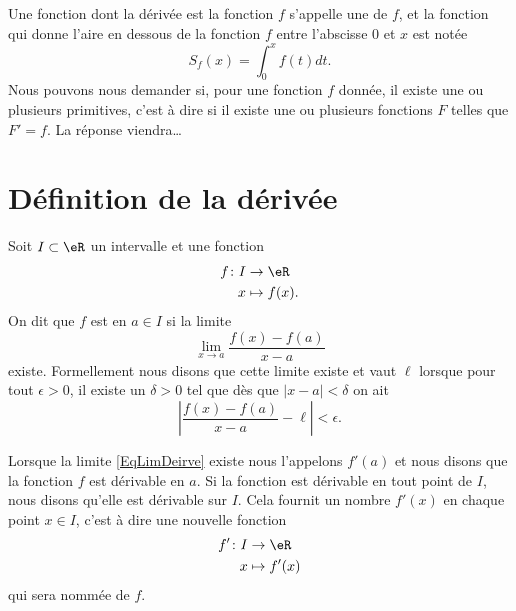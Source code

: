 Une fonction dont la dérivée est la fonction $f$ s'appelle une  de $f$, et la fonction qui donne l'aire en dessous de la fonction $f$ entre l'abscisse $0$ et $x$ est notée
\begin{equation}
	S_f(x)=\int_0^xf(t)dt.
\end{equation}
Nous pouvons nous demander si, pour une fonction $f$ donnée, il existe une ou plusieurs primitives, c'est à dire si il existe une ou plusieurs fonctions $F$ telles que $F'=f$. La réponse viendra\ldots

\section{Définition de la dérivée}

Soit $I\subset\eR$ un intervalle et une fonction
\begin{equation}
	\begin{aligned}
		f\colon I&\to \eR \\
		x&\mapsto f(x). 
	\end{aligned}
\end{equation}
On dit que $f$ est  en $a\in I$ si la limite
\begin{equation}	\label{EqLimDeirve}
	\lim_{x\to a} \frac{ f(x)-f(a) }{ x-a }
\end{equation}
existe. Formellement nous disons que cette limite existe et vaut $\ell$ lorsque pour tout $\epsilon>0$, il existe un $\delta>0$ tel que dès que $| x-a |<\delta$ on ait
\begin{equation}
	\left| \frac{ f(x)-f(a) }{ x-a } -\ell \right| <\epsilon.
\end{equation}

Lorsque la limite \eqref{EqLimDeirve} existe nous l'appelons $f'(a)$ et nous disons que la fonction $f$ est dérivable en $a$. Si la fonction est dérivable en tout point de $I$, nous disons qu'elle est dérivable sur $I$. Cela fournit un nombre $f'(x)$ en chaque point $x\in I$, c'est à dire une nouvelle fonction
\begin{equation}
	\begin{aligned}
		f'\colon I&\to \eR \\
		x&\mapsto f'(x)
	\end{aligned}
\end{equation}
qui sera nommée  de $f$.

